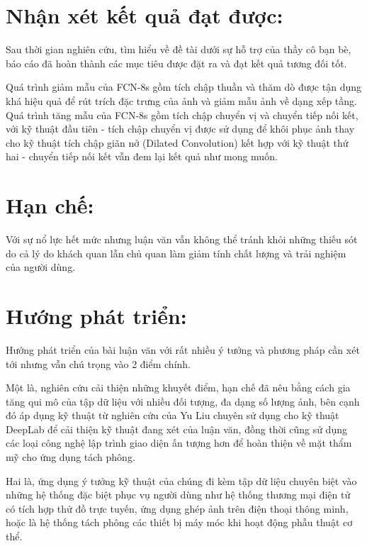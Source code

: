 \documentclass[../the.tex]{subfiles}
\begin{document}
\section{Nhận xét kết quả đạt được:}
\label{comment}
{\fontsize{13}{12} \selectfont
Sau thời gian nghiên cứu, tìm hiểu về đề tài dưới sự hỗ trợ của thầy cô bạn bè, báo cáo đã hoàn thành các mục tiêu được đặt ra và đạt kết quả tương đối tốt. }
\bigskip

{\fontsize{13}{12} \selectfont
		Quá trình giảm mẫu của FCN-8s gồm tích chập thuần và thăm dò được tận dụng khá hiệu quả để rút trích đặc trưng của ảnh và giảm mẫu ảnh về dạng xếp tầng. Quá trình tăng mẫu của FCN-8s gồm tích chập chuyển vị và chuyển tiếp nối kết, với kỹ thuật đầu tiên - tích chập chuyển vị được sử dụng để khôi phục ảnh thay cho kỹ thuật tích chập giãn nở (Dilated Convolution) kết hợp với kỹ thuật thứ hai - chuyển tiếp nối kết vẫn đem lại kết quả như mong muốn.}
\bigskip


\section{Hạn chế:}
\label{limit}
{\fontsize{13}{12} \selectfont
Với sự nổ lực hết mức nhưng luận văn vẫn không thể tránh khỏi những thiếu sót do cả lý do khách quan lẫn chủ quan làm giảm tính chất lượng và trải nghiệm của người dùng.}
\bigskip


\bigskip

\section{Hướng phát triển:}
\label{develop}
{\fontsize{13}{12} \selectfont
Hướng phát triển của bài luận văn với rất nhiều ý tưởng và phương pháp cần xét tới nhưng vẫn chú trọng vào 2 điểm chính. }
\bigskip

{\fontsize{13}{12} \selectfont
	Một là, nghiên cứu cải thiện những khuyết điểm, hạn chế đã nêu bằng cách gia tăng qui mô của tập dữ liệu với nhiều đối tượng, đa dạng số lượng ảnh, bên cạnh đó áp dụng kỹ thuật từ nghiên cứu của Yu Liu \cite{improve_for_back} chuyên sử dụng cho kỹ thuật DeepLab để cải thiện kỹ thuật đang xét của luận văn, đồng thời cũng sử dụng các loại công nghệ lập trình giao diện ấn tượng hơn để hoàn thiện về mặt thẩm mỹ cho ứng dụng tách phông. }
\bigskip

{\fontsize{13}{12} \selectfont
	Hai là, ứng dụng ý tưởng kỹ thuật của chúng đi kèm tập dữ liệu chuyên biệt vào những hệ thống đặc biệt phục vụ người dùng như hệ thống thương mại điện tử có tích hợp thử đồ trực tuyến, ứng dụng ghép ảnh trên điện thoại thông minh, hoặc là hệ thống tách phông các thiết bị máy móc khi hoạt động phẫu thuật cơ thể.}

\bigskip
	
\end{document}
